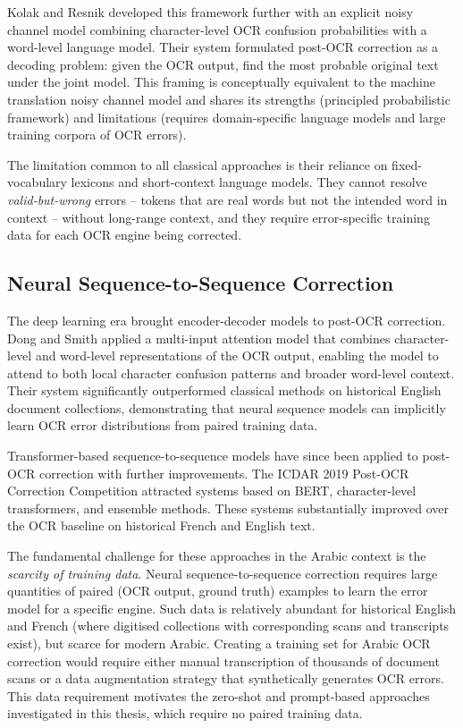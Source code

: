 Kolak and Resnik \cite{kolak2005ocr} developed this framework further with an
explicit noisy channel model combining character-level OCR confusion probabilities
with a word-level language model.
Their system formulated post-OCR correction as a decoding problem: given the
OCR output, find the most probable original text under the joint model.
This framing is conceptually equivalent to the machine translation noisy channel
model and shares its strengths (principled probabilistic framework) and
limitations (requires domain-specific language models and large training corpora
of OCR errors).

The limitation common to all classical approaches is their reliance on
fixed-vocabulary lexicons and short-context language models.
They cannot resolve \emph{valid-but-wrong} errors -- tokens that are real words
but not the intended word in context -- without long-range context, and they
require error-specific training data for each OCR engine being corrected.

\subsection{Neural Sequence-to-Sequence Correction}
\label{subsec:related_neural}

The deep learning era brought encoder-decoder models to post-OCR correction.
Dong and Smith \cite{dong2018multi} applied a multi-input attention model that
combines character-level and word-level representations of the OCR output,
enabling the model to attend to both local character confusion patterns and
broader word-level context.
Their system significantly outperformed classical methods on historical English
document collections, demonstrating that neural sequence models can implicitly
learn OCR error distributions from paired training data.

Transformer-based sequence-to-sequence models have since been applied to
post-OCR correction with further improvements.
The ICDAR 2019 Post-OCR Correction Competition \cite{rigaud2019icdar} attracted
systems based on BERT, character-level transformers, and ensemble methods.
These systems substantially improved over the OCR baseline on historical French
and English text.

The fundamental challenge for these approaches in the Arabic context is the
\emph{scarcity of training data}.
Neural sequence-to-sequence correction requires large quantities of paired
(OCR output, ground truth) examples to learn the error model for a specific
engine.
Such data is relatively abundant for historical English and French (where
digitised collections with corresponding scans and transcripts exist), but
scarce for modern Arabic.
Creating a training set for Arabic OCR correction would require either manual
transcription of thousands of document scans or a data augmentation strategy
that synthetically generates OCR errors.
This data requirement motivates the zero-shot and prompt-based approaches
investigated in this thesis, which require no paired training data.


